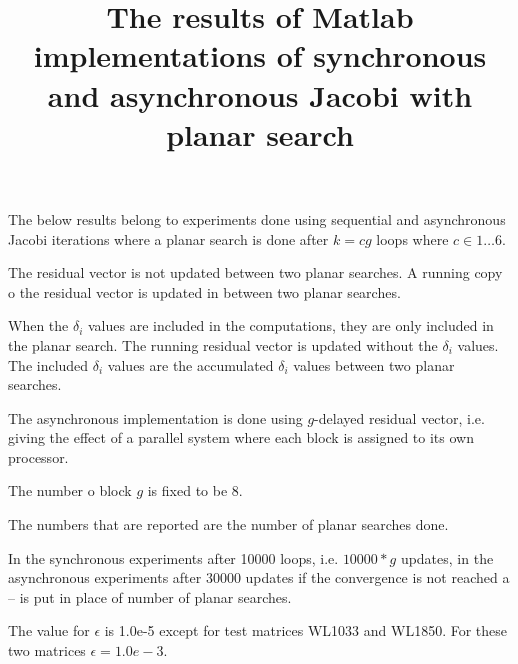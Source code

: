 \documentclass[12pt]{article}
\begin{document}
\title{The results of Matlab implementations of synchronous and asynchronous Jacobi with planar search}
\author{}
\date{}


\maketitle
The below results belong to experiments done using sequential and asynchronous Jacobi iterations 
where a planar search is done after $k = cg$ loops where $c \in {1 \ldots 6}$. 

The residual vector is not updated between two planar searches.
A running copy o the residual vector is updated in between two planar searches.

When the $\delta_i$ values are included in the computations, they are only included
in the planar search. The running residual vector is updated without the $\delta_i$ values.
The included $\delta_i$ values are the accumulated $\delta_i$ values between two planar searches.

The asynchronous implementation is done using $g$-delayed residual vector, i.e. giving the effect of
a parallel system where each block is assigned to its own processor.

The number o block $g$ is fixed to be 8.

The numbers that are reported are the number of planar searches done.

In the synchronous experiments after 10000 loops, i.e. $10000*g$ updates, in the asynchronous experiments
after 30000 updates if the convergence is not reached a -- is put in place of number of planar searches.

The value for $\epsilon$ is  
1.0e-5 except for test matrices WL1033 and WL1850. For these two matrices 
$\epsilon = 1.0e-3$.
\end{document}
